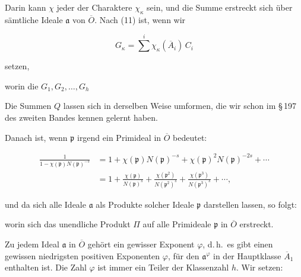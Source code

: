 
Darin kann $\chi$ jeder der Charaktere $\chi_\kappa$ sein, und die Summe erstreckt sich über sämtliche Ideale $\mathfrak{a}$ von $\overline{O}$. Nach (11) ist, wenn wir

\[
G_\kappa = \sum^{i}\chi_\kappa(\overline{A}_i)\,C_i
\]

setzen,


worin die $G_1, G_2, \dots, G_h$ 

Die Summen $Q$ lassen sich in derselben Weise umformen, die wir schon im \S\,197 des zweiten Bandes kennen gelernt haben.

Danach ist, wenn $\mathfrak{p}$ irgend ein Primideal in $\overline{O}$ bedeutet:

\[
\begin{aligned}
\frac{1}{1 - \chi(\mathfrak{p})N(\mathfrak{p})^{-s}} &= 1 + \chi(\mathfrak{p})N(\mathfrak{p})^{-s} + \chi(\mathfrak{p})^2 N(\mathfrak{p})^{-2s} + \cdots \\
&= 1 + \frac{\chi(\mathfrak{p})}{N(\mathfrak{p})^s} + \frac{\chi(\mathfrak{p}^2)}{N(\mathfrak{p}^2)^s} + \frac{\chi(\mathfrak{p}^3)}{N(\mathfrak{p}^3)^s} + \cdots,
\end{aligned}
\]

und da sich alle Ideale $\mathfrak{a}$ als Produkte solcher Ideale $\mathfrak{p}$ darstellen lassen, so folgt:


worin sich das unendliche Produkt $\Pi$ auf alle Primideale $\mathfrak{p}$ in $\overline{O}$ erstreckt.

Zu jedem Ideal $\mathfrak{a}$ in $\overline{O}$ gehört ein gewisser Exponent $\varphi$, d.\,h.\ es gibt einen gewissen niedrigsten positiven Exponenten $\varphi$, für den $\mathfrak{a}^\varphi$ in der Hauptklasse $\overline{A}_1$ enthalten ist. Die Zahl $\varphi$ ist immer ein Teiler der Klassenzahl $h$. Wir setzen:


